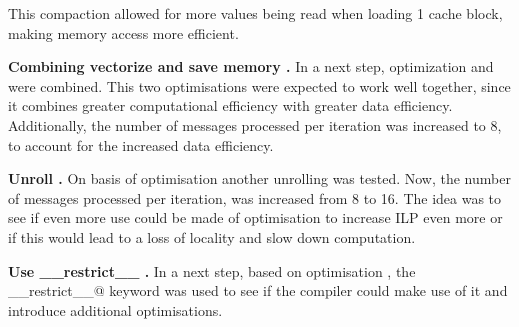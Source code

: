 \documentclass[letterpaper]{article}
\newcommand{\mypar}[1]{{\bf #1.}}
\begin{document}
This compaction allowed for more values being read when loading 1 cache block, making memory access more efficient.


\mypar{Combining vectorize and save memory }
In a next step, optimization  and  were combined. This two optimisations were expected to work well together, since it combines greater computational efficiency with greater data efficiency. Additionally, the number of messages processed per iteration was increased to 8, to account for the increased data efficiency.


\mypar{Unroll }
On basis of optimisation  another unrolling was tested. Now, the number of messages processed per iteration, was increased from 8 to 16. The idea was to see if even more use could be made of optimisation  to increase ILP even more or if this would lead to a loss of locality and slow down computation.


\mypar{Use \_\_restrict\_\_ }
In a next step, based on optimisation , the \verb@__restrict__@ keyword was used to see if the compiler could make use of it and introduce additional optimisations. 

%
%
%
%
\end{document}
